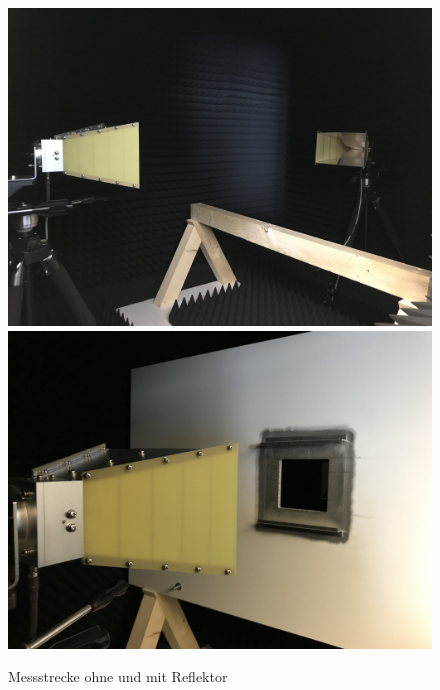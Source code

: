 \begin{figure}[ht]
    \centering
    \includegraphics[height=.2\textheight, draft = false]{Abbildungen/Kapitel4/IMG_5660.jpg}
    \hspace{1cm}
    \includegraphics[height=.2\textheight, draft = false]{Abbildungen/Kapitel4/IMG_5665.jpg}
    \caption{Messstrecke ohne und mit Reflektor}
    \label{fig:4_Messstrecke}
\end{figure}




